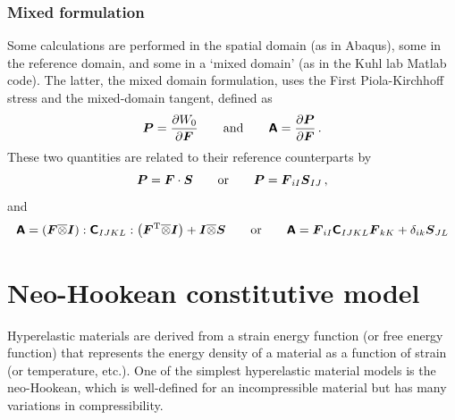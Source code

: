 \documentclass[10pt,letterpaper,oneside]{report}
\newcommand{\ten}[1]{\mbox{\boldmath $#1$}{}}
\newcommand{\tenf}[1]{\mbox{{\sffamily{\bfseries {#1}}}}}
\newcommand{\scas}[1]{\mbox{{\scriptsize{${\rm{#1}}$}}}{}}
\begin{document}


\subsubsection{Mixed formulation}
Some calculations are performed in the spatial domain (as in Abaqus), some in the reference domain, and some in a `mixed domain' (as in the Kuhl lab Matlab code).  The latter, the mixed domain formulation, uses the First Piola-Kirchhoff stress 
and the mixed-domain tangent, defined as
\begin{equation}
\ten{P} = \frac{ \partial W_0 }{ \partial \ten{F} }
\qquad \text{and} \qquad
\tenf{A} = \frac{ \partial \ten{P} }{ \partial \ten{F} } \, .
\end{equation}
These two quantities are related to their reference counterparts by 
\begin{equation}
\ten{P} = \ten{F} \cdot \ten{S} 
\qquad \text{or} \qquad
\ten{P} = \ten{F}_{iI} \ten{S}_{IJ} \, , 
\end{equation}
and
\begin{equation}
\tenf{A} = \left( \ten{F} \overline{\otimes} \ten{I} \right) : \tenf{C}_{IJKL} : \left( \ten{F}^{\scas{T}} \overline{\otimes} \ten{I} \right) + \ten{I} \overline{\otimes} \ten{S} 
\qquad \text{or} \qquad
\tenf{A} = \ten{F}_{iI} \tenf{C}_{IJKL} \ten{F}_{kK} + \delta_{ik} \ten{S}_{JL}
\end{equation}


\section{Neo-Hookean constitutive model} 
Hyperelastic materials are derived from a strain energy function (or free energy function) that represents the energy density of a material as a function of strain (or temperature, etc.).  One of the simplest hyperelastic material models is the neo-Hookean, which is well-defined for an incompressible material but has many variations in compressibility.  
\end{document}
